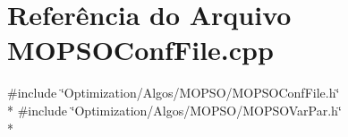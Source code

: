 \section{Referência do Arquivo M\+O\+P\+S\+O\+Conf\+File.\+cpp}
\label{_m_o_p_s_o_conf_file_8cpp}
{\ttfamily \#include \char`\"{}Optimization/\+Algos/\+M\+O\+P\+S\+O/\+M\+O\+P\+S\+O\+Conf\+File.\+h\char`\"{}}\\*
{\ttfamily \#include \char`\"{}Optimization/\+Algos/\+M\+O\+P\+S\+O/\+M\+O\+P\+S\+O\+Var\+Par.\+h\char`\"{}}\\*
